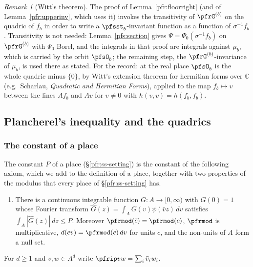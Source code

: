 \documentclass[10pt]{amsart}
\theoremstyle{definition}
\theoremstyle{remark}
\newtheorem{remark}[theorem]{Remark}
\newcommand{\C}{\mathbb C}
\begin{document}
\begin{remark}[Witt's theorem]\label{pfs:witt}
The proof of Lemma~\ref{pfr:floorright} (and of Lemma~\ref{pfr:upperinv}, which uses it) invokes the transitivity of
$\pfrG^{(b)}$ on the quadric of $f_b$ in order to write a $\pfsst_b$-invariant function as a function of $\sigma^{-1}f_b$.
Transitivity is not needed: Lemma~\ref{pfs:section} gives $\Psi=\Psi_0(\sigma^{-1}f_b)$ on $\pfrG^{(b)}$ with
$\Psi_0$ Borel, and the integrals in that proof are integrals against $\mu_b$, which is carried by the orbit
$\pfsO_b$; the remaining step, the $\pfrG^{(b)}$-invariance of $\mu_b$, is used there as stated. For the record:
at the real place $\pfsO_b$ is the whole quadric minus $\{0\}$, by Witt's extension theorem for hermitian forms
over $\C$ (e.g.\ Scharlau, \emph{Quadratic and Hermitian Forms}), applied to
the map $f_b\mapsto v$ between the lines $Af_b$ and $Av$ for $v\ne0$ with $h(v,v)=h(f_b,f_b)$.
\end{remark}

\subsection{Plancherel's inequality and the quadrics}\label{pfs:ss-planch}

\subsubsection*{The constant of a place}
The constant $P$ of a place (\S\ref{pfr:ss-setting}) is the constant of the following axiom, which
we add to the definition of a place, together with two properties of the modulus that every place of
\S\ref{pfr:ss-setting} has.
\begin{enumerate}
\item[(P)] There is a continuous integrable function $G\colon A\to[0,\infty)$ with $G(0)=1$ whose
Fourier transform $\widehat G(z)=\int_AG(v)\psi(\bar vz)\,dv$ satisfies $\int_A|\widehat G(z)|\,dz\le P$.
Moreover $\pfrmod(\bar c)=\pfrmod(c)$, $\pfrmod$ is multiplicative, $d(cv)=\pfrmod(c)\,dv$ for units $c$, and
the non-units of $A$ form a null set.
\end{enumerate}
For $d\ge1$ and $v,w\in A^d$ write $\pfrip vw=\sum_i\bar v_iw_i$.
\end{document}
